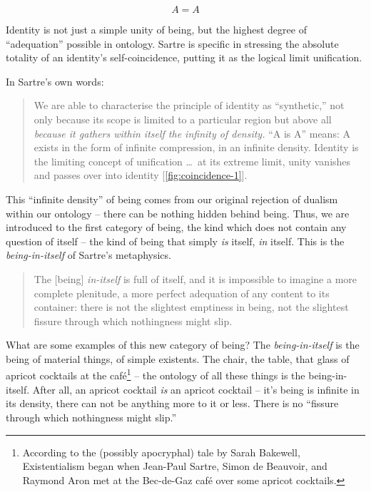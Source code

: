 \begin{equation}
    A = A
\end{equation}

\noindent
Identity is not just a simple unity of being, but the highest degree of \enquote{adequation} possible in ontology. Sartre is specific in stressing the absolute totality of an identity's self-coincidence, putting it as the logical limit unification.



\noindent
In Sartre's own words:

\blockcquote[123]{Sartre}{%
    We are able to characterise the principle of identity as \enquote{synthetic,} not only because its scope is limited to a particular region but above all \emph{because it gathers within itself the infinity of density.} \enquote{A is A} means: A exists in the form of infinite compression, in an infinite density. Identity is the limiting concept of unification \ldots\ at its extreme limit, unity vanishes and passes over into identity [\autoref{fig:coincidence-1}].
}

\noindent
This \enquote{infinite density} of being comes from our original rejection of dualism within our ontology -- there can be nothing hidden behind being.  Thus, we are introduced to the first category of being, the kind which does not contain any question of itself -- the kind of being that simply \emph{is} itself, \emph{in} itself. This is the \emph{being-in-itself} of Sartre's metaphysics. 

\blockcquote[123]{Sartre}{%
    The [being] \emph{in-itself} is full of itself, and it is impossible to imagine a more complete plenitude, a more perfect adequation of any content to its container: there is not the slightest emptiness in being, not the slightest fissure through which nothingness might slip.
}

\noindent
What are some examples of this new category of being? The \emph{being-in-itself} is the being of material things, of simple existents. The chair, the table, that glass of apricot cocktails at the café\footnote{According to the (possibly apocryphal) tale by Sarah Bakewell, Existentialism began when Jean-Paul Sartre, Simon de Beauvoir, and Raymond Aron met at the Bec-de-Gaz café over some apricot cocktails.} -- the ontology of all these things is the being-in-itself. After all, an apricot cocktail \emph{is} an apricot cocktail -- it's being is infinite in its density, there can not be anything more to it or less. There is no \enquote{fissure through which nothingness might slip.}

